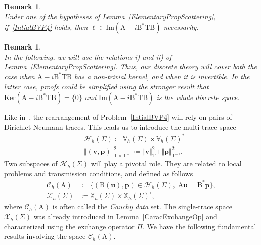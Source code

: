 \documentclass[a4paper,11pt]{article}
\newcommand{\mrm}{\mathrm}
\newcommand{\mA}{\mathrm{A}}
\newcommand{\mB}{\mathrm{B}}
\newcommand{\mT}{\mathrm{T}}
\newcommand{\mbV}{\mathbb{V}}
\newcommand{\mbX}{\mathbb{X}}
\newcommand{\bell}{\boldsymbol{\ell}}
\newcommand{\bp}{\boldsymbol{p}}
\newcommand{\bu}{\boldsymbol{u}}
\newcommand{\bv}{\boldsymbol{v}}
\newtheorem{rem}[defn]{Remark}
\begin{document}
\begin{rem}\label{RemarkCompatibility}\quad\\
  Under one of the hypotheses of Lemma~\ref{ElementaryPropScattering}, if~\eqref{IntialBVP4} holds, then
  $\bell\in \mrm{Im}(\mA-i\mB^*\mT\mB)$ necessarily.
\end{rem}

\begin{rem}\quad\\
  In the following, we will use the relations i) and ii) of Lemma~\ref{ElementaryPropScattering}. Thus, our discrete theory will cover both the case when \(\mA-i\mB^*\mT\mB\) has a non-trivial kernel, and when it is invertible. In the latter case, proofs could be simplified using the stronger result that \(\mrm{Ker}(\mA-i\mB^*\mT\mB)=\{0\}\) and \(\mrm{Im}(\mA-i\mB^*\mT\mB)\) is the whole discrete space.
\end{rem}


Like in~\cite{MR4665035,MR4648528, MR4433119}, the rearrangement of Problem~\eqref{IntialBVP4}
will rely on pairs of
Dirichlet-Neumann traces.
This leads us to introduce the multi-trace space
\begin{equation*}
  \begin{aligned}
    & \mathscr{H}_h(\Sigma)\coloneq \mbV_h(\Sigma)\times \mbV_h(\Sigma)^*\\ &
    \Vert (\bv,\bp)\Vert_{\mT\times\mT^{-1}}^{2} \coloneq \Vert
    \bv\Vert_{\mT}^{2} + \Vert \bp\Vert_{\mT^{-1}}^{2}. 
  \end{aligned}
\end{equation*}
Two subspaces of $\mathscr{H}_h(\Sigma)$ will play a pivotal
role. They are related to local problems and transmission conditions,
and defined as follows
\begin{equation}\label{RemarkableSubspaces}
  \begin{aligned}
    \mathscr{C}_h(\mA) &\coloneq \{(\mB(\bu),\bp)\in \mathscr{H}_h(\Sigma),\; \mA\bu = \mB^{*}\bp\},\\
    \mathscr{X}_h(\Sigma) &\coloneq \mbX_h(\Sigma)\times \mbX_h(\Sigma)^{\circ}, 
  \end{aligned}
\end{equation}
where \(\mathscr{C}_h(\mA)\) is often called the \emph{Cauchy data} set. The single-trace space $\mathscr{X}_h(\Sigma)$ was already introduced in Lemma~\ref{CaracExchangeOp} and characterized using the exchange operator $\Pi$. 
We have the following fundamental results involving the space $\mathscr{C}_h(\mA)$.
\end{document}
